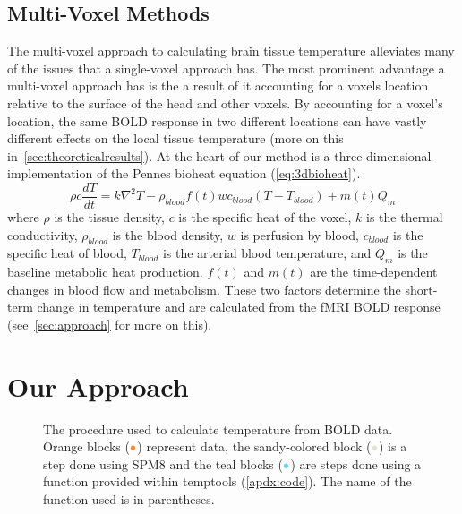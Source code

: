     \subsection{\label{sec:multivox} Multi-Voxel Methods}
    The multi-voxel approach to calculating brain tissue temperature alleviates many of the issues that a single-voxel approach has.  The most prominent advantage a multi-voxel approach has is the a result of it accounting for a voxels location relative to the surface of the head and other voxels.  By accounting for a voxel's location, the same BOLD response in two different locations can have vastly different effects on the local tissue temperature (more on this in~\cref{sec:theoreticalresults}).
    At the heart of our method is a three-dimensional implementation of the Pennes bioheat equation (\cref{eq:3dbioheat})\citep{collins}.
    \begin{equation} \label{eq:3dbioheat} 
    	\rho c \frac{dT}{dt} = k \nabla^{2}T-\rho_{blood}f(t)wc_{blood}(T-T_{blood})+m(t)Q_{m} 
    \end{equation}
  where $\rho$ is the tissue density, $c$ is the specific heat of the voxel, $k$ is the thermal conductivity, $\rho_{blood}$ is the blood density, $w$ is perfusion by blood, $c_{blood}$ is the specific heat of blood, $T_{blood}$ is the arterial blood temperature, and $Q_{m}$ is the baseline metabolic heat production. $f(t)$ and $m(t)$ are the time-dependent changes in blood flow and metabolism. These two factors determine the short-term change in temperature and are calculated from the fMRI BOLD response (see~\cref{sec:approach} for more on this).

\section{\label{sec:approach} Our Approach}
\begin{figure}[tb]
  \vspace{10pt}
  \centering
  
  \caption[Procedure used to calculate temperature change]{\label{fig:procedureflowchart} The procedure used to calculate temperature from BOLD data.  Orange blocks ($\color{goldfish}\bullet$) represent data, the sandy-colored block ($\color{beachstorm}\bullet$) is a step done using SPM8 and the teal blocks ($\color{aoi}\bullet$) are steps done using a function provided within temptools (\cref{apdx:code}).  The name of the function used is in parentheses.}
\end{figure}


